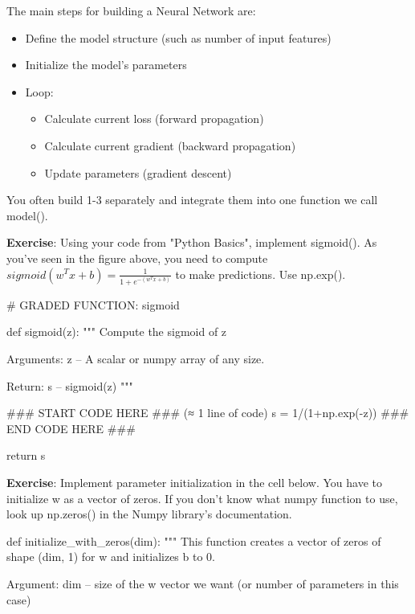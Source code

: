 {{The main steps for building a Neural Network are:
\begin{itemize}
\item Define the model structure (such as number of input features)
\item Initialize the model's parameters
\item Loop:
\begin{itemize}
\item Calculate current loss (forward propagation)
\item Calculate current gradient (backward propagation)
\item Update parameters (gradient descent)
\end{itemize}
\end{itemize}
You often build 1-3 separately and integrate them into one function we call model().



{\textbf {Exercise}}: Using your code from "Python Basics", implement sigmoid(). As you've seen in the figure above, you need to compute $sigmoid( w^T x + b) = \frac{1}{1 + e^{-(w^T x + b)}}$ to make predictions. Use np.exp().

\begin{mypython}
# GRADED FUNCTION: sigmoid

def sigmoid(z):
    """
    Compute the sigmoid of z

    Arguments:
    z -- A scalar or numpy array of any size.

    Return:
    s -- sigmoid(z)
    """

    ### START CODE HERE ### (≈ 1 line of code)
    s = 1/(1+np.exp(-z))
    ### END CODE HERE ###
    
    return s
\end{mypython}




{\textbf {Exercise}}: Implement parameter initialization in the cell below. You have to initialize w as a vector of zeros. If you don't know what numpy function to use, look up np.zeros() in the Numpy library's documentation.
\begin{mypython}
def initialize_with_zeros(dim):
    """
    This function creates a vector of zeros of shape (dim, 1) for w and initializes b to 0.
    
    Argument:
    dim -- size of the w vector we want (or number of parameters in this case)
    

\end{mypython}}}
